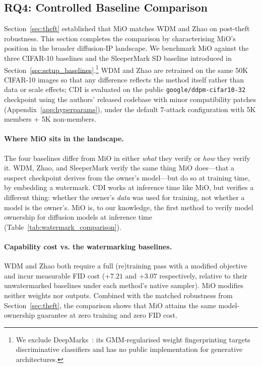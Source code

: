 \documentclass{article}
\begin{document}
\subsection{RQ4: Controlled Baseline Comparison}
\label{sec:baseline_comparison}

Section~\ref{sec:theft} established that MiO matches WDM and Zhao
on post-theft robustness. This section completes the comparison by
characterising MiO's position in the broader diffusion-IP landscape.
We benchmark MiO against the three CIFAR-10 baselines and the
SleeperMark SD baseline introduced in
Section~\ref{sec:setup_baselines}.\footnote{We exclude
DeepMarks~\citep{chen2019deepmarks}: its GMM-regularised weight
fingerprinting targets discriminative classifiers and has no public
implementation for generative architectures.}
WDM and Zhao are retrained on the same 50K CIFAR-10 images so that
any difference reflects the method itself rather than data or scale
effects; CDI is evaluated on the public
\texttt{google/ddpm-cifar10-32} checkpoint using the authors'
released codebase with minor compatibility patches
(Appendix~\ref{app:hyperparams}), under the default 7-attack
configuration with 5K members + 5K non-members.

\paragraph{Where MiO sits in the landscape.}
The four baselines differ from MiO in either \emph{what} they
verify or \emph{how} they verify it. WDM, Zhao, and SleeperMark
verify the same thing MiO does---that a suspect checkpoint
derives from the owner's model---but do so at training time, by
embedding a watermark. CDI works at inference time like MiO, but
verifies a different thing: whether the owner's \emph{data} was
used for training, not whether a model is the owner's.
MiO is, to our knowledge, the first method to verify model
ownership for diffusion models at inference time
(Table~\ref{tab:watermark_comparison}).

\paragraph{Capability cost vs. the watermarking baselines.}
WDM and Zhao both require a full (re)training pass with a modified
objective and incur measurable FID cost (+$7.21$ and +$3.07$
respectively, relative to their unwatermarked baselines under each
method's native sampler).  MiO modifies neither weights nor outputs.
Combined with the matched robustness from
Section~\ref{sec:theft}, the comparison shows that MiO attains the
same model-ownership guarantee at zero training and zero FID cost.
\end{document}
